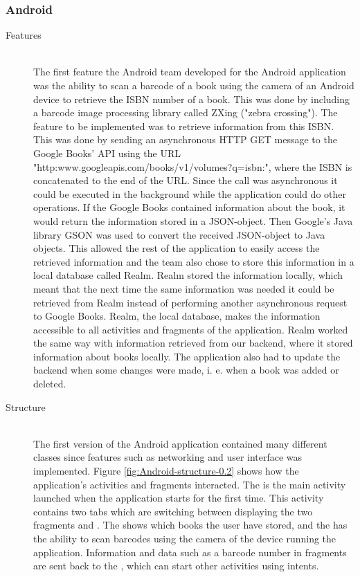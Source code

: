 \subsubsection{Android}
\begin{description}
    \item[Features] \hfill\\
The first feature the Android team developed for the Android application was the ability to scan a barcode of a book using the camera of an Android device to retrieve the ISBN number of a book. This was done by including a barcode image processing library called ZXing ("zebra crossing").\cite{zxing} The feature to be implemented was to retrieve information from this ISBN. This was done by sending an asynchronous \gls{HTTP} GET message to the Google Books' \gls{API} using the URL "http:www.googleapis.com/books/v1/volumes?q=isbn:", where the ISBN is concatenated to the end of the URL.\cite{http-method-spec} Since the call was asynchronous it could be executed in the background while the application could do other operations. If the Google Books contained information about the book, it would return the information stored in a JSON-object.\cite{json} Then Google's Java library GSON was used to convert the received JSON-object to Java objects.\cite{gson} This allowed the rest of the application to easily access the retrieved information and the team also chose to store this information in a local database called Realm. Realm stored the information locally, which meant that the next time the same information was needed it could be retrieved from Realm instead of performing another asynchronous request to Google Books. Realm, the local database, makes the information accessible to all activities and fragments of the application. Realm worked the same way with information retrieved from our \gls{backend}, where it stored information about books locally. The application also had to update the \gls{backend} when some changes were made, i. e. when a book was added or deleted.\\

\item[Structure] \hfill\\
The first version of the Android application contained many different classes since features such as networking and user interface was implemented. Figure \ref{fig:Android-structure-0.2} shows how the application's activities and fragments interacted. The  is the main activity launched when the application starts for the first time. This activity contains two tabs which are switching between displaying the two fragments  and . The  shows which books the user have stored, and the  has the ability to scan barcodes using the camera of the device running the application. Information and data such as a barcode number in fragments are sent back to the , which can start other activities using intents. 


\end{description}
